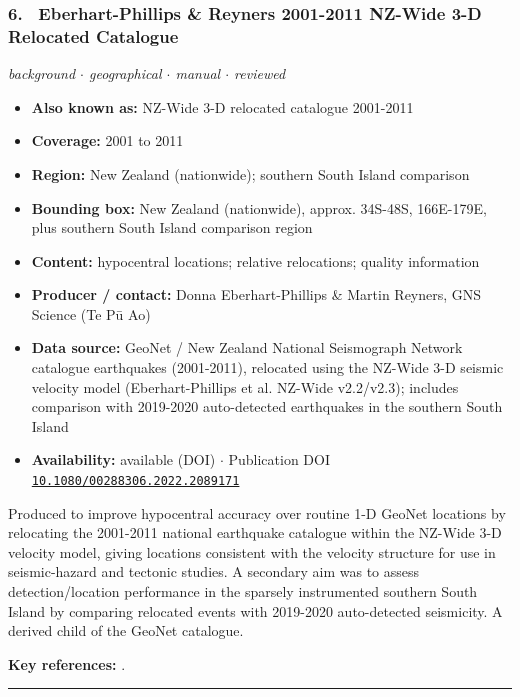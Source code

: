 \documentclass[10pt,a4paper]{article}
\newcommand{\catentryrule}{\par\vspace{3pt}\noindent\textcolor{rulegrey}{\rule{\linewidth}{0.3pt}}\par\vspace{5pt}}
\newcommand{\kv}[2]{\item \textbf{#1:} #2}
\begin{document}
\subsubsection*{\hypertarget{c:6}{6.}~ Eberhart-Phillips \& Reyners 2001-2011 NZ-Wide 3-D Relocated Catalogue}
{\small\itshape background $\cdot$ geographical $\cdot$ manual $\cdot$ reviewed}\par\vspace{2pt}
\begin{itemize}[leftmargin=1.3em,itemsep=0.6pt,topsep=1pt,parsep=0pt]
\kv{Also known as}{NZ-Wide 3-D relocated catalogue 2001-2011}
\kv{Coverage}{2001 to 2011}
\kv{Region}{New Zealand (nationwide); southern South Island comparison}
\kv{Bounding box}{New Zealand (nationwide), approx. 34S-48S, 166E-179E, plus southern South Island comparison region}
\kv{Content}{hypocentral locations; relative relocations; quality information}
\kv{Producer / contact}{Donna Eberhart-Phillips \& Martin Reyners, GNS Science (Te Pū Ao)}
\kv{Data source}{GeoNet / New Zealand National Seismograph Network catalogue earthquakes (2001-2011), relocated using the NZ-Wide 3-D seismic velocity model (Eberhart-Phillips et al. NZ-Wide v2.2/v2.3); includes comparison with 2019-2020 auto-detected earthquakes in the southern South Island}
\kv{Availability}{available (DOI) $\cdot$ Publication DOI \href{https://doi.org/10.1080/00288306.2022.2089171}{\nolinkurl{10.1080/00288306.2022.2089171}}}
\end{itemize}
\par\vspace{2pt}Produced to improve hypocentral accuracy over routine 1-D GeoNet locations by relocating the 2001-2011 national earthquake catalogue within the NZ-Wide 3-D velocity model, giving locations consistent with the velocity structure for use in seismic-hazard and tectonic studies. A secondary aim was to assess detection/location performance in the sparsely instrumented southern South Island by comparing relocated events with 2019-2020 auto-detected seismicity. A derived child of the GeoNet catalogue.
\par\vspace{2pt}\textbf{Key references:} \cite{EberhartPhillips2022,EberhartPhillips2022a,EberhartPhillips2020}.
\catentryrule
\end{document}
